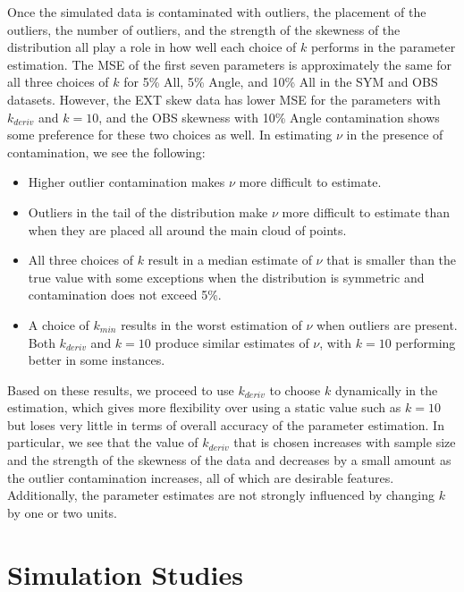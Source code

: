 \documentclass[12pt]{article}
\begin{document}
\begin{doublespacing}
Once the simulated data is contaminated with outliers, the placement of the outliers, the number of outliers, and the strength of the skewness of the distribution all play a role in how well each choice of $k$ performs in the parameter estimation.  The MSE of the first seven parameters is approximately the same for all three choices of $k$ for 5\% All, 5\% Angle, and 10\% All  in the SYM and OBS datasets.  However, the EXT skew data has lower MSE for the parameters with $k_{deriv}$ and $k=10$, and the OBS skewness with 10\% Angle contamination shows some preference for these two choices as well.  In estimating $\nu$ in the presence of contamination, we see the following:
\begin{itemize}
\item Higher outlier contamination makes $\nu$ more difficult to estimate.
\item Outliers in the tail of the distribution make $\nu$ more difficult to estimate than when they are placed all around the main cloud of points.
\item All three choices of $k$ result in a median estimate of $\nu$ that is smaller than the true value with some exceptions when the distribution is symmetric and contamination does not exceed 5\%.
\item A choice of $k_{min}$ results in the worst estimation of $\nu$ when outliers are present.  Both $k_{deriv}$ and $k=10$ produce similar estimates of $\nu$, with $k=10$ performing better in some instances.
\end{itemize}

Based on these results, we proceed to use  $k_{deriv}$ to choose $k$ dynamically in the estimation, which gives more flexibility over using a static value such as $k=10$ but loses very little in terms of overall accuracy of the parameter estimation.  In particular, we see that the value of $k_{deriv}$ that is chosen increases with sample size and the strength of the skewness of the data and decreases by a small amount as the outlier contamination increases, all of which are desirable features.  Additionally, the parameter estimates are not strongly influenced by changing $k$ by one or two units.


\section{{Simulation Studies}}\label{sec:sim}


\end{doublespacing}
\end{document}
